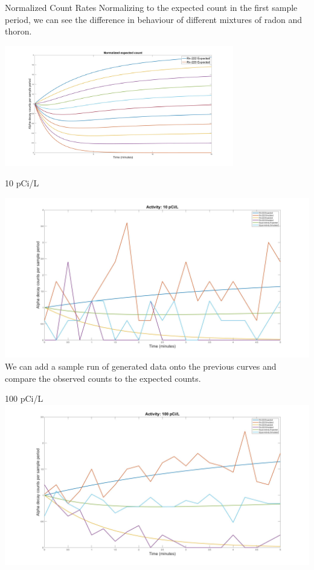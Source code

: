 \documentclass{beamer}
\begin{document}
\begin{frame}{Normalized Count Rates}
Normalizing to the expected count in the first sample period, we can see the difference in behaviour of different mixtures of radon and thoron.
    \begin{center}
        \includegraphics[width=0.75\textwidth]{images/expected_counts.jpg}
    \end{center}
\end{frame}
\begin{frame}{10 pCi/L}

    \includegraphics[width=\textwidth]{images/10pCipL.jpg}
    We can add a sample run of generated data onto the previous curves and compare the observed counts to the expected counts.
\end{frame}
\begin{frame}{100 pCi/L}
    \includegraphics[width=\textwidth]{images/100pCipL.jpg}
\end{frame}
\end{document}
